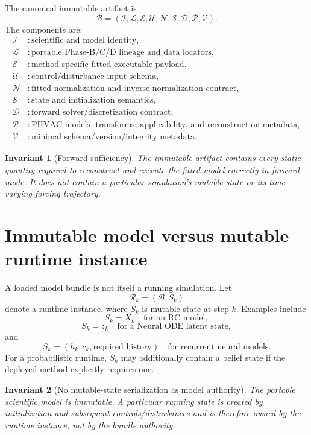 \documentclass[11pt]{article}
\newcommand{\Bun}{\mathcal{B}}
\newcommand{\Run}{\mathcal{R}}
\newcommand{\Lineage}{\mathcal{L}}
\newcommand{\Exec}{\mathcal{E}}
\newcommand{\Norm}{\mathcal{N}}
\newcommand{\InputSpec}{\mathcal{U}}
\newcommand{\StateSpec}{\mathcal{S}}
\newcommand{\Disc}{\mathcal{D}}
\newcommand{\PH}{\mathcal{P}}
\newcommand{\Version}{\mathcal{V}}
\newtheorem{invariant}{Invariant}
\begin{document}
The canonical immutable artifact is
\[
\boxed{
\Bun=
(\mathcal I,\Lineage,\Exec,\InputSpec,\Norm,\StateSpec,\Disc,\PH,\Version).
}
\]
The components are:
\begin{align*}
\mathcal I &: \text{scientific and model identity},\\
\Lineage &: \text{portable Phase-B/C/D lineage and data locators},\\
\Exec &: \text{method-specific fitted executable payload},\\
\InputSpec &: \text{control/disturbance input schema},\\
\Norm &: \text{fitted normalization and inverse-normalization contract},\\
\StateSpec &: \text{state and initialization semantics},\\
\Disc &: \text{forward solver/discretization contract},\\
\PH &: \text{PHVAC models, transforms, applicability, and reconstruction metadata},\\
\Version &: \text{minimal schema/version/integrity metadata}.
\end{align*}

\begin{invariant}[Forward sufficiency]
The immutable artifact contains every static quantity required to reconstruct and
execute the fitted model correctly in forward mode. It does not contain a
particular simulation's mutable state or its time-varying forcing trajectory.
\end{invariant}

\section{Immutable model versus mutable runtime instance}

A loaded model bundle is not itself a running simulation. Let
\[
\boxed{\Run_k=(\Bun,S_k)}
\]
denote a runtime instance, where $S_k$ is mutable state at step $k$.
Examples include
\[
S_k=X_k \quad \text{for an RC model},
\]
\[
S_k=z_k \quad \text{for a Neural ODE latent state},
\]
and
\[
S_k=(h_k,c_k,\text{required history})
\quad \text{for recurrent neural models}.
\]
For a probabilistic runtime, $S_k$ may additionally contain a belief state if
the deployed method explicitly requires one.

\begin{invariant}[No mutable-state serialization as model authority]
The portable scientific model is immutable. A particular running state is
created by initialization and subsequent controls/disturbances and is therefore
owned by the runtime instance, not by the bundle authority.
\end{invariant}
\end{document}
